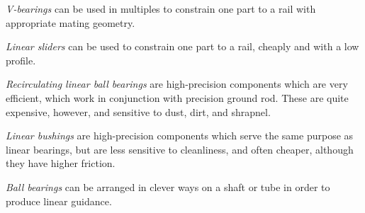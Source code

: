 	 
	\begin{asparaenum}[a)]
		\item \textit{V-bearings} can be used in multiples to constrain one part to a rail with appropriate mating geometry.
		\item \textit{Linear sliders} can be used to constrain one part to a rail, cheaply and with a low profile.
		\item \textit{Recirculating linear ball bearings} are high-precision components which are very efficient, which work in conjunction with precision ground rod. These are quite expensive, however, and sensitive to dust, dirt, and shrapnel.
		\item \textit{Linear bushings} are high-precision components which serve the same purpose as linear bearings, but are less sensitive to cleanliness, and often cheaper, although they have higher friction.
		\item \textit{Ball bearings} can be arranged in clever ways on a shaft or tube in order to produce linear guidance.
	\end{asparaenum}

